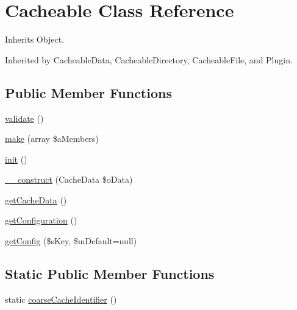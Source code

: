 \hypertarget{class_cacheable}{\section{Cacheable Class Reference}
\label{class_cacheable}
}


Inherits Object.



Inherited by Cacheable\-Data, Cacheable\-Directory, Cacheable\-File, and Plugin.

\subsection*{Public Member Functions}
\begin{DoxyCompactItemize}
\item 
\hyperlink{class_cacheable_ab70b135c0d4c3c3db6be09057ec7e361}{validate} ()
\item 
\hyperlink{class_cacheable_a1443eacff201d0317e4481cda75eb44b}{make} (array \$a\-Members)
\item 
\hyperlink{class_cacheable_a3bda7dd0df982212ce5817b5a30f2284}{init} ()
\item 
\hyperlink{class_cacheable_a16d53ddf3c4ac7217c32df7f0d763454}{\-\_\-\-\_\-construct} (Cache\-Data \$o\-Data)
\item 
\hyperlink{class_cacheable_a3825ea17270319f96d27540ae347fcde}{get\-Cache\-Data} ()
\item 
\hyperlink{class_cacheable_a1a737bc8da70a953cc9d21a7654aab6d}{get\-Configuration} ()
\item 
\hyperlink{class_cacheable_a525b1b070b6f528c6bbe1df12194fab1}{get\-Config} (\$s\-Key, \$m\-Default=null)
\end{DoxyCompactItemize}
\subsection*{Static Public Member Functions}
\begin{DoxyCompactItemize}
\item 
static \hyperlink{class_cacheable_ab6090f0ed75d626d969d6f88b0cbf882}{coarse\-Cache\-Identifier} ()
\end{DoxyCompactItemize}


